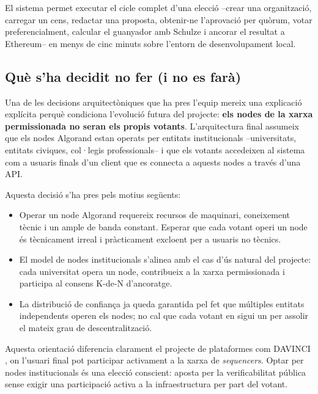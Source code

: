 El sistema permet executar el cicle complet d'una elecció --crear una
organització, carregar un cens, redactar una proposta, obtenir-ne
l'aprovació per quòrum, votar preferencialment, calcular el guanyador
amb Schulze i ancorar el resultat a Ethereum-- en menys de cinc minuts
sobre l'entorn de desenvolupament local.

\subsection{Què s'ha decidit no fer (i no es farà)}

Una de les decisions arquitectòniques que ha pres l'equip mereix una
explicació explícita perquè condiciona l'evolució futura del
projecte: \textbf{els nodes de la xarxa permissionada no seran els
propis votants}. L'arquitectura final assumeix que els nodes Algorand
estan operats per entitats institucionals --universitats, entitats
civiques, col·legis professionals-- i que els votants accedeixen al
sistema com a usuaris finals d'un client que es connecta a aquests
nodes a través d'una \ac{API}.

Aquesta decisió s'ha pres pels motius següents:

\begin{itemize}
    \item Operar un node Algorand requereix recursos de maquinari,
    coneixement tècnic i un ample de banda constant. Esperar que cada
    votant operi un node és tècnicament irreal i pràcticament
    excloent per a usuaris no tècnics.

    \item El model de nodes institucionals s'alinea amb el cas d'ús
    natural del projecte: cada universitat opera un node, contribueix
    a la xarxa permissionada i participa al consens K-de-N
    d'ancoratge.

    \item La distribució de confiança ja queda garantida pel fet que
    múltiples entitats independents operen els nodes; no cal que cada
    votant en sigui un per assolir el mateix grau de
    descentralització.
\end{itemize}

Aquesta orientació diferencia clarament el projecte de plataformes com
DAVINCI \cite{vocdoni2026davinci}, on l'usuari final pot participar
activament a la xarxa de \emph{sequencers}. Optar per nodes
institucionals és una elecció conscient: aposta per la
verificabilitat pública sense exigir una participació activa a
la infraestructura per part del votant.

